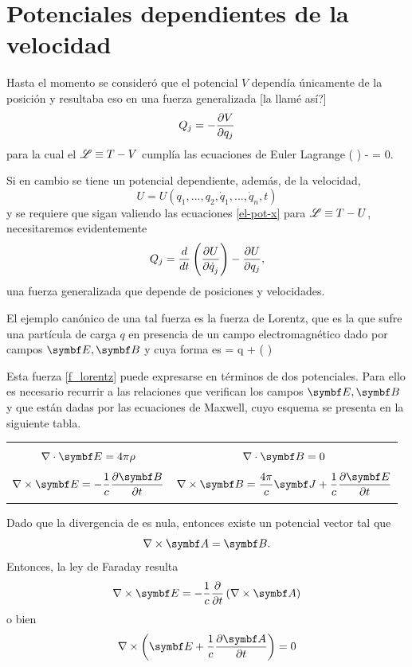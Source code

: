\documentclass[10pt,oneside]{CBFT_book}
\begin{document}
\section{Potenciales dependientes de la velocidad}

Hasta el momento se consideró que el potencial $V$ dependía únicamente de la posición y resultaba eso en
una fuerza generalizada [la llamé así?]
\[
	Q_j = -\frac{\partial^{\hspace{-0.05em}} {V}}{\partial {q_j}^{\hspace{-0.05em}}}
\]
para la cual el $\mathscr{L}\equiv T-V$ cumplía las ecuaciones de Euler Lagrange
\be
	 \left(  \right) -  = 0.
	\label{el-pot-x}
\ee

Si en cambio se tiene un potencial dependiente, además, de la velocidad,
\[
	U = U(q_1, ..., q_2,\dot{q}_1,...,\dot{q}_n,t ) 
\]
y se requiere que sigan valiendo las ecuaciones \eqref{el-pot-x} para $\mathscr{L} \equiv T-U$, necesitaremos evidentemente
\[
	Q_j = \frac{d^{\hspace{-0.05em}} {}}{d {t}^{\hspace{-0.05em}}} \left( \frac{\partial^{\hspace{-0.05em}} {U}}{\partial {\dot{q}_j}^{\hspace{-0.05em}}} \right)  -\frac{\partial^{\hspace{-0.05em}} {U}}{\partial {q_j}^{\hspace{-0.05em}}},
\]
una fuerza generalizada que depende de posiciones y velocidades.

El ejemplo canónico de una tal fuerza es la fuerza de Lorentz, que es la que sufre una partícula de carga $q$ en
presencia de un campo electromagnético dado por campos $\vb{E}, \vb{B}$ y cuya forma es
\be
	 = q  +  (  \times {} )
	\label{f_lorentz}
\ee

Esta fuerza \eqref{f_lorentz} puede expresarse en términos de dos potenciales. Para ello es necesario recurrir a
las relaciones que verifican los campos $\vb{E}, \vb{B}$ y que están dadas por las ecuaciones de Maxwell, cuyo esquema 
se presenta en la siguiente tabla.
\begin{center}
\begin{tabular}{|c|c|}
\hline
& \\
$ \nabla\cdot\vb{E} = 4 \pi \rho $ & $ \nabla \cdot \vb{B} = 0 $ \\
& \\
$ \displaystyle \rotorm{E} = -\frac{1}{c} \dpar{\vb{B}}{t} $ &  
$ \displaystyle \rotorm{B} = \frac{4\pi}{c}\vb{J} + \frac{1}{c} \dpar{\vb{E}}{t} $ \\
 & \\
\hline
\end{tabular}
\end{center}

Dado que la divergencia de  es nula, entonces existe un potencial vector  tal que 
\[
	\rotorm{A} = \vb{B}.
\]
Entonces, la ley de Faraday resulta 
\[
	\rotorm{E} = -\frac{1}{c} \dpar{}{t} \left(\rotorm{A} \right) 
\]
o bien 
\[
	\nabla\times\left( \vb{E} + \frac{1}{c}\dpar{\vb{A}}{t} \right) = 0
\]
\end{document}
